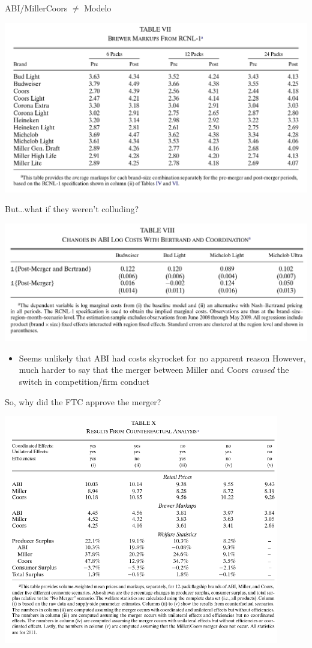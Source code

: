 \documentclass[dvipsnames]{beamer}
\begin{document}
\begin{frame}{ABI/MillerCoors $\ne$ Modelo}
  \begin{center}
   \includegraphics[width=\textwidth, keepaspectratio=true]{tab7.png} 
  \end{center}
\end{frame}
%
\begin{frame}{But\ldots what if they weren't colluding?}
  \begin{center}
    \includegraphics[width=\textwidth, keepaspectratio=true]{tab8.png}
  \end{center}
  \begin{itemize}
  \item Seems unlikely that ABI had costs skyrocket for no apparent reason
    \vitem However, much harder to say that the merger between Miller and Coors \emph{caused} the switch in competition/firm conduct
  \end{itemize}
\end{frame}
%
\begin{frame}{So, why did the FTC approve the merger?}
  \begin{center}
    \includegraphics[width=0.9\textwidth, keepaspectratio=true]{tab10.png}
  \end{center}
\end{frame}
\end{document}
